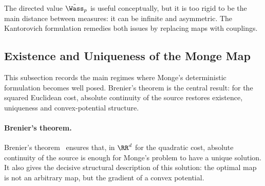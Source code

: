 The directed value $\tilde\Wass_p$ is useful conceptually, but it is too rigid to be the main distance between measures: it can be infinite and asymmetric. The Kantorovich formulation remedies both issues by replacing maps with couplings.

\subsection{Existence and Uniqueness of the Monge Map}
\label{sec-monge-existence-uniqueness}

This subsection records the main regimes where Monge's deterministic formulation becomes well posed. Brenier's theorem is the central result: for the squared Euclidean cost, absolute continuity of the source restores existence, uniqueness and convex-potential structure.

\paragraph{Brenier's theorem.}

Brenier's theorem~\cite{MR923203,Brenier91} ensures that, in $\RR^d$ for the quadratic cost, absolute continuity of the source is enough for Monge's problem to have a unique solution. It also gives the decisive structural description of this solution: the optimal map is not an arbitrary map, but the gradient of a convex potential.

